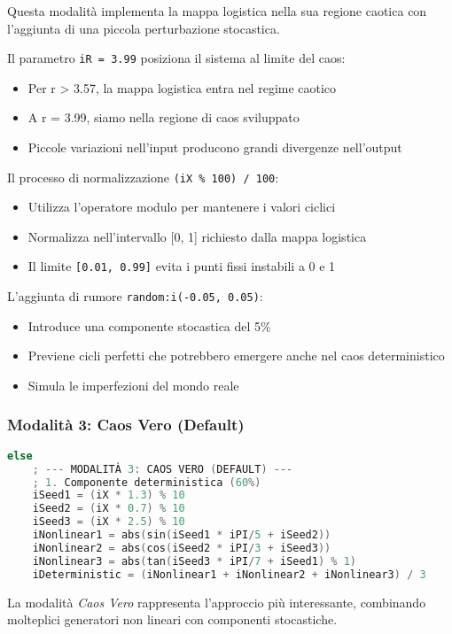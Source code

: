 Questa modalità implementa la mappa logistica nella sua regione caotica con l'aggiunta di una piccola perturbazione stocastica.

Il parametro \texttt{iR = 3.99} posiziona il sistema al limite del caos:
\begin{itemize}
    \item Per r > 3.57, la mappa logistica entra nel regime caotico
    \item A r = 3.99, siamo nella regione di caos sviluppato
    \item Piccole variazioni nell'input producono grandi divergenze nell'output
\end{itemize}

Il processo di normalizzazione \texttt{(iX \% 100) / 100}:
\begin{itemize}
    \item Utilizza l'operatore modulo per mantenere i valori ciclici
    \item Normalizza nell'intervallo [0, 1] richiesto dalla mappa logistica
    \item Il limite \texttt{[0.01, 0.99]} evita i punti fissi instabili a 0 e 1
\end{itemize}

L'aggiunta di rumore \texttt{random:i({-}0.05, 0.05)}:
\begin{itemize}
    \item Introduce una componente stocastica del 5\%
    \item Previene cicli perfetti che potrebbero emergere anche nel caos deterministico
    \item Simula le imperfezioni del mondo reale
\end{itemize}
\subsubsection{Modalità 3: Caos Vero (Default)}
\begin{lstlisting}[language=C]
else
    ; --- MODALITÀ 3: CAOS VERO (DEFAULT) ---
    ; 1. Componente deterministica (60%)
    iSeed1 = (iX * 1.3) % 10
    iSeed2 = (iX * 0.7) % 10
    iSeed3 = (iX * 2.5) % 10
    iNonlinear1 = abs(sin(iSeed1 * iPI/5 + iSeed2))
    iNonlinear2 = abs(cos(iSeed2 * iPI/3 + iSeed3))
    iNonlinear3 = abs(tan(iSeed3 * iPI/7 + iSeed1) % 1)
    iDeterministic = (iNonlinear1 + iNonlinear2 + iNonlinear3) / 3
\end{lstlisting}

La modalità \textit{Caos Vero} rappresenta l'approccio più interessante, combinando molteplici generatori non lineari con componenti stocastiche.

